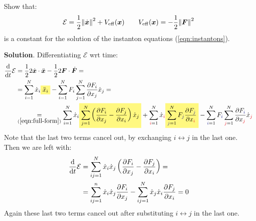 \documentclass[../template.tex]{subfiles}
\begin{document}
\begin{exo}
    Show that:
    \begin{align*}
        \mathcal{E}= \frac{1}{2} \norm{\dot{\bm{x}}}^2 + V_{\mathrm{eff} }(\bm{x}) \qquad V_{\mathrm{eff} }(\bm{x}) = -\frac{1}{2} \norm{\bm{F}}^2   
    \end{align*}
    is a constant for the solution of the instanton equations (\ref{eqn:instantons}).

    \medskip

    \textbf{Solution}. Differentiating $\mathcal{E}$ wrt time:
    \begin{align*}
        \dv{t} \mathcal{E}&= \frac{1}{2} 2 \dot{\bm{x}} \cdot \ddot{\bm{x}} -\frac{1}{2} 2 \bm{F} \cdot \dot{\bm{F}} =\\
        &= \sum_{i=1}^N \dot{x}_i \hlc{Yellow}{\ddot{x}_i }- \sum_{i=1}^N F_i \sum_{j=1}^N \pdv{F_i}{x_j} \dot{x}_j =\\
        &\underset{(\ref{eqn:full-form})}{=}  \sum_{i=1}^N \dot{x}_i \hlc{Yellow}{\sum_{j=1}^N \left(\pdv{F_i}{x_j} - \pdv{F_j}{x_i}\right) \dot{x}_j }+ \sum_{{\textcolor{Red}{i}}=1}^N \dot{x}_{\textcolor{Red}{i}} \hlc{Yellow}{\sum_{{\textcolor{Blue}{j}}=1}^N F_{\textcolor{Blue}{j}} \pdv{F_{\textcolor{Blue}{j}}}{x_{\textcolor{Red}{i}}}} - \sum_{{\textcolor{Blue}{i}}=1}^N F_{\textcolor{Blue}{i}} \sum_{{\textcolor{Red}{j}}=1}^N \pdv{F_{\textcolor{Blue}{i}}}{x_{\textcolor{Red}{j}}} \dot{x}_{\textcolor{Red}{j}}
    \end{align*}  
    Note that the last two terms cancel out, by exchanging $i \leftrightarrow j$ in the last one. Then we are left with:
    \begin{align*}
        \dv{t}\mathcal{E}&= \sum_{ij=1}^N \dot{x}_i \dot{x}_j \left(\pdv{F_i}{x_j} - \pdv{F_j}{x_i}\right) =\\
        &= \sum_{ij=1}^n \dot{x}_i \dot{x}_j \pdv{F_i}{x_j} - \sum_{ij=1}^N \dot{x}_j \dot{x}_i \pdv{F_j}{x_i} = 0
    \end{align*}
    Again these last two terms cancel out after substituting $i\leftrightarrow j$ in the last one.
\end{exo} 
\end{document}
